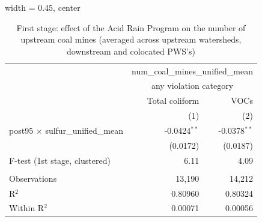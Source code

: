 
\begin{table}[htbp]
   
   \caption{\label{tab:fs_dwnstrmcolocate_nonminevio} First stage: effect of the Acid Rain Program on the number of upstream coal mines (averaged across upstream watersheds, downstream and colocated PWS's)}
   \bigskip
   
   \centering
   
   \begin{adjustbox}{width = 0.45\textwidth, center}
      
      
      \begin{tabular}{lrr}
         \toprule
         
          & \multicolumn{2}{c}{num\_coal\_mines\_unified\_mean}\\
         
          & \multicolumn{2}{c}{any violation category} \\ 
                                                  & Total coliform & VOCs \\   
         
                                                  & (1)            & (2)\\  
         
         \midrule 
         post95 $\times$ sulfur\_unified\_mean    & -0.0424$^{**}$ & -0.0378$^{**}$\\   
                                                  & (0.0172)       & (0.0187)\\   
         
         F-test (1st stage, clustered)            & 6.11           & 4.09\\  
         
          \\
         
         Observations                             & 13,190         & 14,212\\  
         R$^2$                                    & 0.80960        & 0.80324\\  
         Within R$^2$                             & 0.00071        & 0.00056\\  
         
         \bottomrule
         
      \end{tabular}
      
      

\end{adjustbox}
\end{table}
